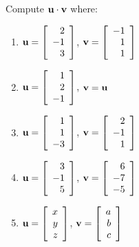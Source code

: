 \begin{multicols}{2}
\begin{ex}
Compute $\textbf{u} \cdot \textbf{v}$ where:

\begin{enumerate}[label={\alph*.}]
\item $\textbf{u} = \left[
\begin{array}{r}
2\\
-1\\
3
\end{array}
\right]$, 
$\textbf{v} = \left[
\begin{array}{r}
-1\\
1\\
1
\end{array}
\right]
$

\item $\textbf{u} = \left[
\begin{array}{r}
1\\
2\\
-1
\end{array}
\right]$,
$\textbf{v} = \textbf{u}
$


\item $\textbf{u} = \left[
\begin{array}{r}
1\\
1\\
-3
\end{array}
\right]$, 
$\textbf{v} = \left[
\begin{array}{r}
2\\
-1\\
1
\end{array}
\right]
$

\item $\textbf{u} = \left[
\begin{array}{r}
3\\
-1\\
5
\end{array}
\right]$, 
$\textbf{v} = \left[
\begin{array}{r}
6\\
-7\\
-5
\end{array}
\right]
$

\item$\textbf{u} = \left[
\begin{array}{r}
x\\
y\\
z
\end{array}
\right]$, 
$\textbf{v} = \left[
\begin{array}{r}
a\\
b\\
c
\end{array}
\right]
$


\end{enumerate}
\end{ex}
\end{multicols}
